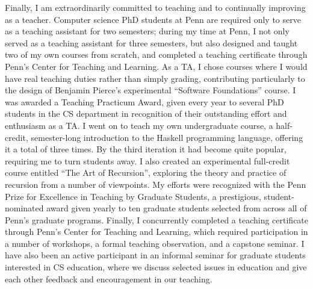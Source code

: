 \documentclass[12pt]{article}
\begin{document}
Finally, I am extraordinarily committed to teaching and to continually
improving as a teacher.  Computer science PhD students at Penn are
required only to serve as a teaching assistant for two semesters;
during my time at Penn, I not only served as a teaching assistant for
three semesters, but also designed and taught two of my own courses
from scratch, and completed a teaching certificate through Penn's
Center for Teaching and Learning.  As a TA, I chose courses where I
would have real teaching duties rather than simply grading,
contributing particularly to the design of Benjamin Pierce's
experimental ``Software Foundations'' course. I was awarded a Teaching
Practicum Award, given every year to several PhD students in the CS
department in recognition of their outstanding effort and enthusiasm
as a TA.  I went on to teach my own undergraduate course, a
half-credit, semester-long introduction to the Haskell programming
language, offering it a total of three times. By the third iteration
it had become quite popular, requiring me to turn students away.  I
also created an experimental full-credit course entitled ``The Art of
Recursion'', exploring the theory and practice of recursion from a
number of viewpoints.  My efforts were recognized with the Penn Prize
for Excellence in Teaching by Graduate Students, a prestigious,
student-nominated award given yearly to ten graduate students selected
from across all of Penn's graduate programs.  Finally, I concurrently
completed a teaching certificate through Penn's Center for Teaching
and Learning, which required participation in a number of workshops, a
formal teaching observation, and a capstone seminar.  I have also been
an active participant in an informal seminar for graduate students
interested in CS education, where we discuss selected issues in
education and give each other feedback and encouragement in our
teaching.
\end{document}
